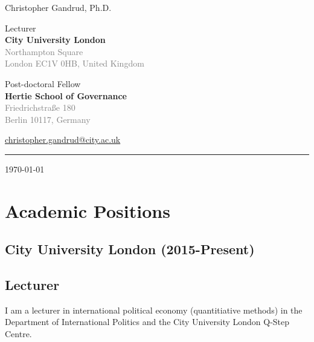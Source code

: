 \documentclass[a4paper]{article}
\begin{document}
    \begin{flushright}
        {\huge{Christopher Gandrud, Ph.D.}} \\
        \vspace{0.25cm}

        Lecturer \\
        {\bf{\large{City University London}}} \\
        \textcolor{gray}{Northampton Square \\
        London EC1V 0HB, United Kingdom} \\
        \vspace{0.25cm}

        Post-doctoral Fellow \\
        {\bf{\large{Hertie School of Governance}}} \\
        \textcolor{gray}{Friedrichstra{\ss}e 180\\
        Berlin 10117, Germany} \\
        \vspace{0.25cm}

        \href{mailto:christopher.gandrud@city.ac.uk}{christopher.gandrud@city.ac.uk}\\[0.25cm]

        \medskip\hrule height 1pt

        \vspace{0.5cm}

        \today

    \end{flushright}



\vspace{0.5cm}

\section*{Academic Positions}

\subsection*{City University London (2015-Present)}

\subsection*{Lecturer}

I am a lecturer in international political economy (quantitiative methods) in the Department of International Politics and the City University London Q-Step Centre.
\end{document}
